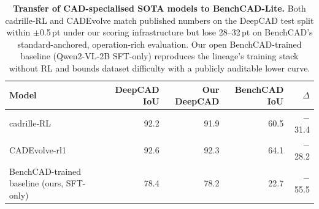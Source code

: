\begin{table}[t]
\centering
\small
\caption{\textbf{Transfer of CAD-specialised SOTA models to BenchCAD-Lite.} Both cadrille-RL and CADEvolve match published numbers on the DeepCAD test split within $\pm$0.5\,pt under our scoring infrastructure but lose 28--32\,pt on BenchCAD's standard-anchored, operation-rich evaluation. Our open BenchCAD-trained baseline (Qwen2-VL-2B SFT-only) reproduces the lineage's training stack without RL and bounds dataset difficulty with a publicly auditable lower curve.}
\label{tab:transfer}
\begin{tabular}{lrr|rr}
\toprule
Model & DeepCAD IoU & Our DeepCAD & BenchCAD IoU & $\Delta$ \\
\midrule
cadrille-RL~\citep{Kolodiazhnyi2026}  & 92.2 & 91.9 & 60.5 & $-$31.4 \\
CADEvolve-rl1~\citep{Elistratov2026}  & 92.6 & 92.3 & 64.1 & $-$28.2 \\
\midrule
BenchCAD-trained baseline (ours, SFT-only) & 78.4 & 78.2 & 22.7 & $-$55.5 \\
\bottomrule
\end{tabular}
\end{table}
